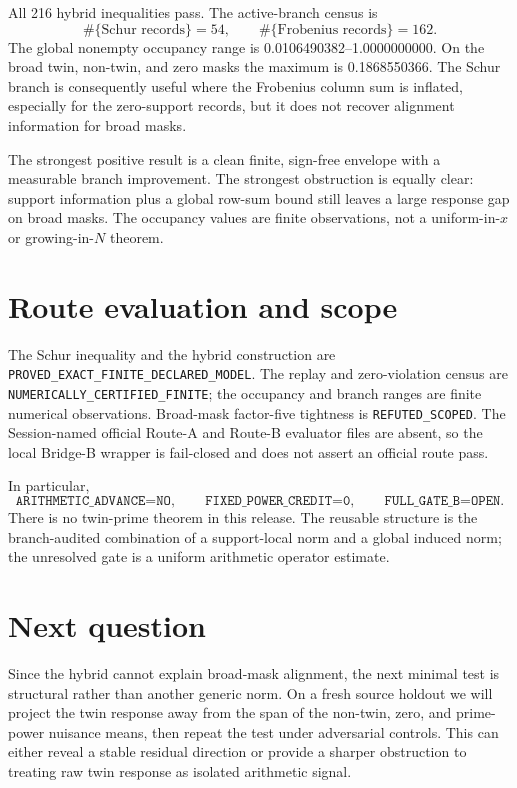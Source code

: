 \documentclass[10pt]{article}
\begin{document}
All 216 hybrid inequalities pass.  The active-branch census is
\[
 \#\{\text{Schur records}\}=54,\qquad
 \#\{\text{Frobenius records}\}=162.
\]
The global nonempty occupancy range is
0.0106490382--1.0000000000.  On the broad twin, non-twin, and zero masks the
maximum is 0.1868550366.  The Schur branch is consequently useful where the
Frobenius column sum is inflated, especially for the zero-support records,
but it does not recover alignment information for broad masks.

The strongest positive result is a clean finite, sign-free envelope with a
measurable branch improvement.  The strongest obstruction is equally clear:
support information plus a global row-sum bound still leaves a large response
gap on broad masks.  The occupancy values are finite observations, not a
uniform-in-$x$ or growing-in-$N$ theorem.

\section{Route evaluation and scope}

The Schur inequality and the hybrid construction are
\texttt{PROVED\_EXACT\_FINITE\_DECLARED\_MODEL}.  The replay and zero-violation
census are \texttt{NUMERICALLY\_CERTIFIED\_FINITE}; the occupancy and branch
ranges are finite numerical observations.  Broad-mask factor-five tightness
is \texttt{REFUTED\_SCOPED}.  The Session-named official Route-A and Route-B
evaluator files are absent, so the local Bridge-B wrapper is fail-closed and
does not assert an official route pass.

In particular,
\[
 \texttt{ARITHMETIC\_ADVANCE=NO},\qquad
 \texttt{FIXED\_POWER\_CREDIT=0},\qquad
 \texttt{FULL\_GATE\_B=OPEN}.
\]
There is no twin-prime theorem in this release.  The reusable structure is
the branch-audited combination of a support-local norm and a global induced
norm; the unresolved gate is a uniform arithmetic operator estimate.

\section{Next question}

Since the hybrid cannot explain broad-mask alignment, the next minimal test
is structural rather than another generic norm.  On a fresh source holdout we
will project the twin response away from the span of the non-twin, zero, and
prime-power nuisance means, then repeat the test under adversarial controls.
This can either reveal a stable residual direction or provide a sharper
obstruction to treating raw twin response as isolated arithmetic signal.
\end{document}
